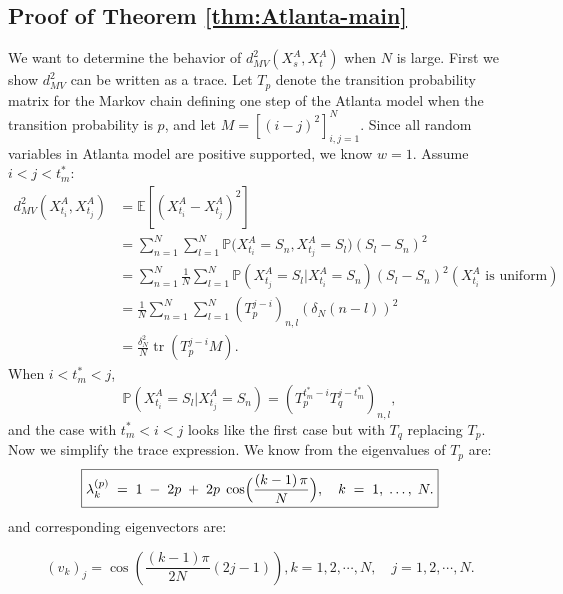 \documentclass[12pt]{article}
\newcommand{\EE}{\mathbb{E}}
\newcommand{\PP}{\mathbb{P}}
\theoremstyle{definition}
\newcommand{\tr}{\operatorname{tr}}
\begin{document}
\subsection{Proof of Theorem \ref{thm:Atlanta-main}}

We want to determine the behavior of $d_{MV}^2(X_s^A,X_t^A)$ when $N$ is large. First we show $d_{MV}^2$ can be written as a trace. Let $T_p$ denote the transition probability matrix for the Markov chain defining one step of the Atlanta model when the transition probability is $p$, and let $M=[(i-j)^2]_{i,j=1}^N$. 
Since all random variables in Atlanta model are positive supported, we know $w=1.$ Assume $i<j<t^*_m$:
\begin{align*}
d^2_{MV}\left(X^A_{t_i} , X^A_{t_j}\right) & = \EE[  \left(X^A_{t_i} - X^A_{t_j}\right)^2 ] \\
&=\sum_{n=1}^N\sum_{l=1}^N\PP\bigl( X_{t_i}^A=S_n, X_{t_j}^A=S_l\bigr)(S_l-S_n)^2\\
& =  \sum^N_{n=1} \frac{1}{N}\sum^N_{l=1} \PP\left(X^A_{t_j} = S_l | X^A_{t_i} = S_n \right)  \left(S_l - S_n \right)^2 (X^A_{t_i}\text{ is uniform}) \\
&= \frac{1}{N} \sum^N_{n=1}\sum^N_{l=1} \left(T^{j-i}_{p}\right)_{n,l}(\delta_N(n-l))^2 \\
& = \frac{\delta^2_N}{N} \tr\left(T_p^{j-i} M \right).
\end{align*}
When $i<t^*_m<j$, 
$$
\PP(X^A_{t_i} = S_l | X^A_{t_j} = S_n ) = \left(T_p^{t_m^*-i}T_q^{j-t_m^*}\right)_{n,l},
$$ and the case with $t_m^*<i<j$ looks like the first case but with $T_q$ replacing $T_p$. Now we simplify the trace expression. 
We know from \cite{kouachi2006eigenvalues} the eigenvalues of $T_p$ are: 
\[
\boxed{
\lambda_k^{(p)}
\;=\;
1 \;-\; 2p
\;+\;
2p\;\cos\Bigl(\frac{(k-1)\,\pi}{N}\Bigr),
\quad
k \;= \;1,\;\dots,\;N.
}
\]
and corresponding eigenvectors are:

$$
\boxed{
(v_k)_j = \cos\left( \frac{ (k-1) \pi}{2 N} (2j-1) \right) , k=1,2,\cdots ,N , \quad j = 1,2, \cdots, N.}
$$
\end{document}
